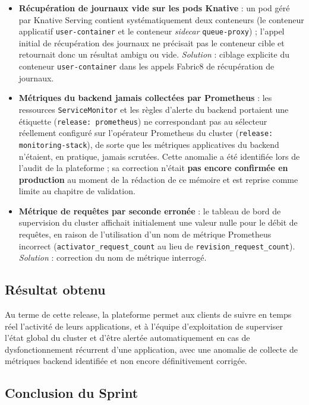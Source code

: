\begin{itemize}
    \item \textbf{Récupération de journaux vide sur les pods Knative} : un pod géré par Knative Serving contient systématiquement deux conteneurs (le conteneur applicatif \texttt{user-container} et le conteneur \textit{sidecar} \texttt{queue-proxy}) ; l'appel initial de récupération des journaux ne précisait pas le conteneur cible et retournait donc un résultat ambigu ou vide. \textit{Solution} : ciblage explicite du conteneur \texttt{user-container} dans les appels Fabric8 de récupération de journaux.
    \item \textbf{Métriques du backend jamais collectées par Prometheus} : les ressources \texttt{ServiceMonitor} et les règles d'alerte du backend portaient une étiquette (\texttt{release: prometheus}) ne correspondant pas au sélecteur réellement configuré sur l'opérateur Prometheus du cluster (\texttt{release: monitoring-stack}), de sorte que les métriques applicatives du backend n'étaient, en pratique, jamais scrutées. Cette anomalie a été identifiée lors de l'audit de la plateforme ; sa correction n'était \textbf{pas encore confirmée en production} au moment de la rédaction de ce mémoire et est reprise comme limite au chapitre de validation.
    \item \textbf{Métrique de requêtes par seconde erronée} : le tableau de bord de supervision du cluster affichait initialement une valeur nulle pour le débit de requêtes, en raison de l'utilisation d'un nom de métrique Prometheus incorrect (\texttt{activator\_request\_count} au lieu de \texttt{revision\_request\_count}). \textit{Solution} : correction du nom de métrique interrogé.
\end{itemize}

\subsection{Résultat obtenu}

Au terme de cette release, la plateforme permet aux clients de suivre en temps réel l'activité de leurs applications, et à l'équipe d'exploitation de superviser l'état global du cluster et d'être alertée automatiquement en cas de dysfonctionnement récurrent d'une application, avec une anomalie de collecte de métriques backend identifiée et non encore définitivement corrigée.

\subsection{Conclusion du Sprint}

